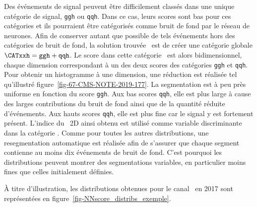 \par
Des événements de signal peuvent être difficilement classés dans une unique catégorie de signal, \texttt{ggh} ou \texttt{qqh}.
Dans ce cas, leurs scores sont bas pour ces catégories et ils pourraient être catégorisés comme bruit de fond par le réseau de neurones.
Afin de conserver autant que possible de tels événements hors des catégories de bruit de fond,
la solution trouvée~\cite{CMS-NOTE-2019-177} est de créer une catégorie globale $\CATxxh=\texttt{ggh} + \texttt{qqh}$.
Le score dans cette catégorie \CATxxh\ est alors bidimensionnel, chaque dimension correspondant à un des deux scores des catégories \texttt{ggh} et \texttt{qqh}.
Pour obtenir un histogramme à une dimension, une réduction est réalisée tel qu'illustré figure~\ref{fig-67-CMS-NOTE-2019-177}.
La segmentation est à peu près uniforme en fonction du score \texttt{ggh}.
Aux bas scores \texttt{qqh}, elle est plus large à cause des larges contributions du bruit de fond ainsi que de la quantité réduite d'événements.
Aux hauts scores \texttt{qqh}, elle est plus fine car le signal y est fortement présent.
L'indice du \NNscore\ 2D ainsi obtenu est utilisé comme variable discriminante dans la catégorie \CATxxh.
Comme pour toutes les autres distributions, une resegmentation automatique est réalisée afin de s'assurer que chaque segment contienne au moins dix événements de bruit de fond.
C'est pourquoi les distributions peuvent montrer des segmentations variables, en particulier moins fines que celles initialement définies.
\par
À titre d'illustration, les distributions obtenues pour le canal \ele\mu\ en 2017 sont représentées en figure~\ref{fig-NNscore_distribs_exemple}.